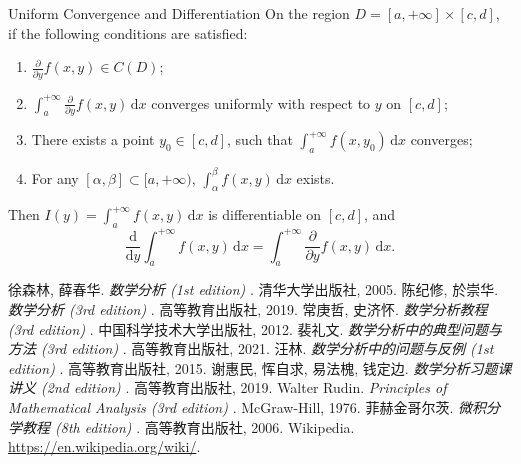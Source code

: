 \documentclass[11pt]{../../TexTemplate/elegantbook}
\begin{document}
\vspace{0.7cm}
\begin{theorem}{Uniform Convergence and Differentiation}
    On the region \(D = [a, +\infty] \times [c, d]\), if the following conditions are satisfied:
    \begin{enumerate}[label=(\roman*)]
        \item \(\frac{\partial }{\partial y}f(x, y) \in C(D)\);
        \item \(\int_{a}^{+\infty} \frac{\partial }{\partial y}f(x, y) \, \mathrm{d}x\) converges uniformly 
            with respect to \(y\) on \([c, d]\);
        \item There exists a point \(y_{0} \in [c, d]\), such that \(\int_{a}^{+\infty} f(x, y_{0}) \, \mathrm{d}x\) converges;
        \item For any \([\alpha, \beta]\subset [a, +\infty)\), \(\int_{\alpha}^{\beta} f(x, y) \, \mathrm{d}x\) exists.
    \end{enumerate}
    Then \(I(y) = \int_{a}^{+\infty} f(x, y) \, \mathrm{d}x\) is differentiable on \([c, d]\), and
    \[
    \frac{\mathrm{d}}{\mathrm{d}y} \int_{a}^{+\infty} f(x, y) \, \mathrm{d}x =
    \int_{a}^{+\infty} \frac{\partial }{\partial y} f(x, y) \, \mathrm{d}x.
    \]
\end{theorem}


\begin{thebibliography}{99} 
 徐森林, 薛春华. \emph{数学分析 (1st edition) }. 清华大学出版社, 2005.
 陈纪修, 於崇华. \emph{数学分析 (3rd edition) }. 高等教育出版社, 2019.
 常庚哲, 史济怀. \emph{数学分析教程 (3rd edition) }. 中国科学技术大学出版社, 2012.
 裴礼文. \emph{数学分析中的典型问题与方法 (3rd edition) }. 高等教育出版社, 2021.
 汪林. \emph{数学分析中的问题与反例 (1st edition) }. 高等教育出版社, 2015.
 谢惠民, 恽自求, 易法槐, 钱定边. \emph{数学分析习题课讲义 (2nd edition) }. 高等教育出版社, 2019.
 Walter Rudin. \emph{Principles of Mathematical Analysis (3rd edition) }. McGraw-Hill, 1976.
 菲赫金哥尔茨. \emph{微积分学教程 (8th edition) }. 高等教育出版社, 2006.
 Wikipedia. \url{https://en.wikipedia.org/wiki/}.
\end{thebibliography}
\end{document}
